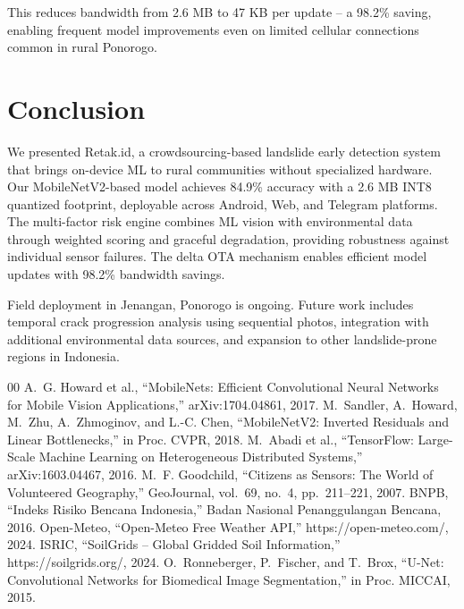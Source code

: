 \documentclass[conference]{IEEEtran}
\begin{document}
This reduces bandwidth from 2.6 MB to 47 KB per update -- a 98.2\% saving, enabling frequent model improvements even on limited cellular connections common in rural Ponorogo.

\section{Conclusion}

We presented Retak.id, a crowdsourcing-based landslide early detection system that brings on-device ML to rural communities without specialized hardware. Our MobileNetV2-based model achieves 84.9\% accuracy with a 2.6 MB INT8 quantized footprint, deployable across Android, Web, and Telegram platforms. The multi-factor risk engine combines ML vision with environmental data through weighted scoring and graceful degradation, providing robustness against individual sensor failures. The delta OTA mechanism enables efficient model updates with 98.2\% bandwidth savings.

Field deployment in Jenangan, Ponorogo is ongoing. Future work includes temporal crack progression analysis using sequential photos, integration with additional environmental data sources, and expansion to other landslide-prone regions in Indonesia.

\begin{thebibliography}{00}
	 A.~G. Howard et al., ``MobileNets: Efficient Convolutional Neural Networks for Mobile Vision Applications,'' arXiv:1704.04861, 2017.
	 M.~Sandler, A.~Howard, M.~Zhu, A.~Zhmoginov, and L.-C. Chen, ``MobileNetV2: Inverted Residuals and Linear Bottlenecks,'' in Proc. CVPR, 2018.
	 M.~Abadi et al., ``TensorFlow: Large-Scale Machine Learning on Heterogeneous Distributed Systems,'' arXiv:1603.04467, 2016.
	 M.~F. Goodchild, ``Citizens as Sensors: The World of Volunteered Geography,'' GeoJournal, vol.~69, no.~4, pp.~211--221, 2007.
	 BNPB, ``Indeks Risiko Bencana Indonesia,'' Badan Nasional Penanggulangan Bencana, 2016.
	 Open-Meteo, ``Open-Meteo Free Weather API,'' https://open-meteo.com/, 2024.
	 ISRIC, ``SoilGrids -- Global Gridded Soil Information,'' https://soilgrids.org/, 2024.
	 O.~Ronneberger, P.~Fischer, and T.~Brox, ``U-Net: Convolutional Networks for Biomedical Image Segmentation,'' in Proc. MICCAI, 2015.
\end{thebibliography}
\end{document}
